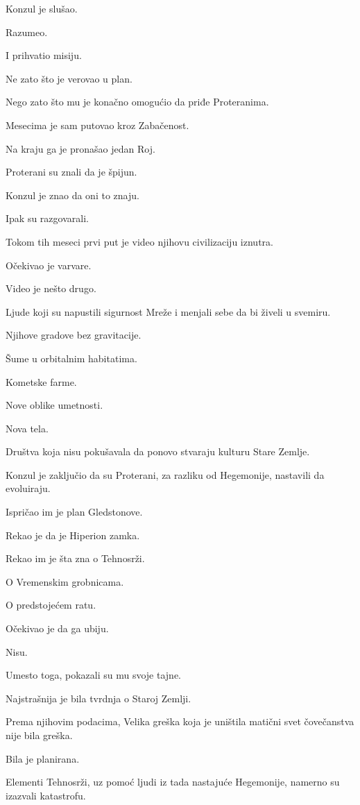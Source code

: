 Konzul je slušao.

Razumeo.

I prihvatio misiju.

Ne zato što je verovao u plan.

Nego zato što mu je konačno omogućio da priđe Proteranima.

\bigskip

Mesecima je sam putovao kroz Zabačenost.

Na kraju ga je pronašao jedan Roj.

Proterani su znali da je špijun.

Konzul je znao da oni to znaju.

Ipak su razgovarali.

Tokom tih meseci prvi put je video njihovu civilizaciju iznutra.

Očekivao je varvare.

Video je nešto drugo.

Ljude koji su napustili sigurnost Mreže i menjali sebe da bi živeli u svemiru.

Njihove gradove bez gravitacije.

Šume u orbitalnim habitatima.

Kometske farme.

Nove oblike umetnosti.

Nova tela.

Društva koja nisu pokušavala da ponovo stvaraju kulturu Stare Zemlje.

Konzul je zaključio da su Proterani, za razliku od Hegemonije, nastavili da evoluiraju.

Ispričao im je plan Gledstonove.

Rekao je da je Hiperion zamka.

Rekao im je šta zna o Tehnosrži.

O Vremenskim grobnicama.

O predstojećem ratu.

Očekivao je da ga ubiju.

Nisu.

Umesto toga, pokazali su mu svoje tajne.

Najstrašnija je bila tvrdnja o Staroj Zemlji.

Prema njihovim podacima, Velika greška koja je uništila matični svet čovečanstva nije bila greška.

Bila je planirana.

Elementi Tehnosrži, uz pomoć ljudi iz tada nastajuće Hegemonije, namerno su izazvali katastrofu.

